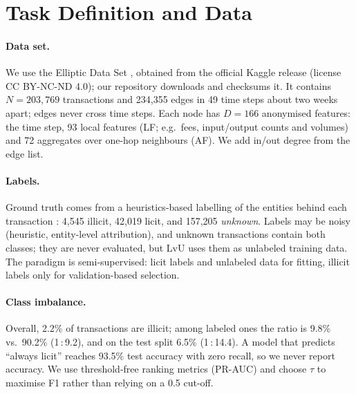 \documentclass[11pt]{article}
\newcommand{\ours}{LvU}
\begin{document}
\section{Task Definition and Data}
\label{sec:data}

\paragraph{Data set.}
We use the Elliptic Data Set \citep{weber2019aml}, obtained from the official Kaggle release (license CC BY-NC-ND 4.0); our repository downloads and checksums it.
It contains $N=203{,}769$ transactions and 234,355 edges in 49 time steps about two weeks apart; edges never cross time steps.
Each node has $D=166$ anonymised features: the time step, 93 local features (LF; e.g.\ fees, input/output counts and volumes) and 72 aggregates over one-hop neighbours (AF).
We add in/out degree from the edge list.

\paragraph{Labels.}
Ground truth comes from a heuristics-based labelling of the entities behind each transaction \citep{weber2019aml}: 4,545 illicit, 42,019 licit, and 157,205 \emph{unknown}.
Labels may be noisy (heuristic, entity-level attribution), and unknown transactions contain both classes; they are never evaluated, but \ours{} uses them as unlabeled training data.
The paradigm is semi-supervised: licit labels and unlabeled data for fitting, illicit labels only for validation-based selection.

\begin{table}[t]
\centering\small
\setlength{\tabcolsep}{3pt}

\caption{Chronological split shared by all methods.}
\label{tab:data}
\end{table}

\paragraph{Class imbalance.}
Overall, 2.2\% of transactions are illicit; among labeled ones the ratio is 9.8\% vs.\ 90.2\% (1\,:\,9.2), and on the test split 6.5\% (1\,:\,14.4).
A model that predicts ``always licit'' reaches 93.5\% test accuracy with zero recall, so we never report accuracy.
We use threshold-free ranking metrics (PR-AUC) and choose $\tau$ to maximise F1 rather than relying on a 0.5 cut-off.
\end{document}
